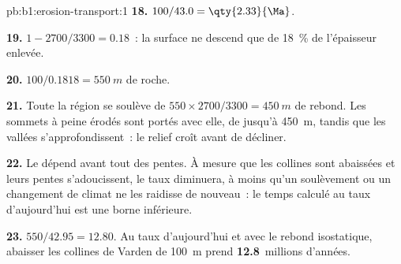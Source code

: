 \begin{solution}{pb:b1:erosion-transport:1}
\textbf{18.} $100/43.0 = \qty{2.33}{\Ma}$.

\textbf{19.} $1 - 2700/3300 = 0.18$~: la surface ne descend que de
\qty{18}{\percent} de l'épaisseur enlevée.

\textbf{20.} $100/0.1818 = \qty{550}{m}$ de roche.

\textbf{21.} Toute la région se soulève de $550 \times 2700/3300 = \qty{450}{m}$
de rebond. Les sommets à peine érodés sont portés avec elle, de jusqu'à
\qty{450}{m}, tandis que les vallées s'approfondissent~: le relief croît avant de décliner.

\textbf{22.} Le  dépend avant tout des pentes. À mesure que les collines
sont abaissées et leurs pentes s'adoucissent, le taux diminuera, à moins qu'un soulèvement ou un
changement de climat ne les raidisse de nouveau~: le temps calculé au taux d'aujourd'hui est une
borne inférieure.

\textbf{23.} $550/42.95 = 12.80$. Au taux d'aujourd'hui et avec le rebond isostatique,
abaisser les collines de Varden de \qty{100}{m} prend \textbf{12.8}~millions d'années.
\end{solution}
